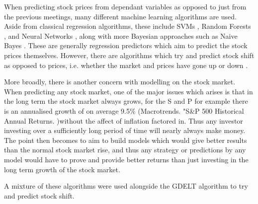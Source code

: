 When predicting stock prices from dependant variables as opposed to just from the previous meetings, many different machine learning algorithms are used. Aside from classical regression algorithms, these include SVMs \cite{cao2003support}, Random Forests \cite{khaidem2016predicting}, and Neural Networks \cite{egeli2003stock}, along with more Bayesian approaches such as Naive Bayes \cite{khedr2017predicting}. These are generally regression predictors which aim to predict the stock prices themselves. However, there are algorithms which try and predict stock shift as opposed to prices, i.e. whether the market and prices have gone up or down \cite{nguyen2015sentiment}.  

More broadly, there is another concern with modelling on the stock market. When predicting any stock market, one of the major issues which arises is that in the long term the stock market always grows, for the S and P for example there is an annualised growth of on average 9.5\% (Macrotrends. "S\&P 500 Historical Annual Returns. )without the affect of inflation factored in. Thus any investor investing over a sufficiently long period of time will nearly always make money. The point then becomes to aim to build models which would give better results than the normal stock market rise, and thus any strategy or predictions by any model would have to prove and provide better returns than just investing in the long term growth of the stock market.

A mixture of these algorithms were used alongside the GDELT algorithm to try and predict stock shift. 

